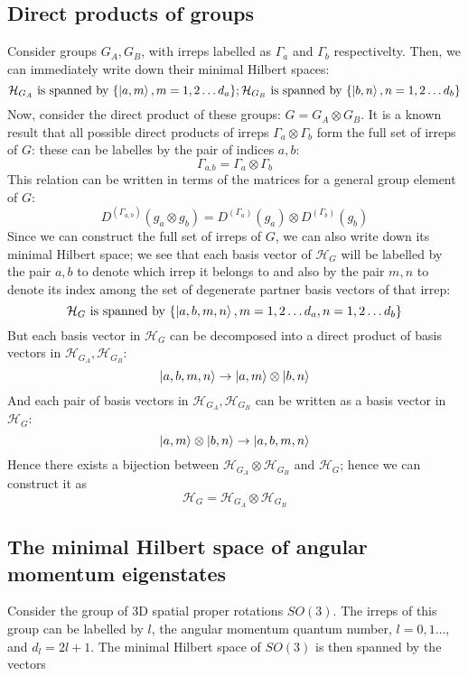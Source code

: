 \documentclass[12pt]{article}
\begin{document}
	\subsection{Direct products of groups}
	
	Consider groups $G_A, G_B$, with irreps labelled as $\Gamma_a$ and $\Gamma_b$ respectivelty. Then, we can immediately write down their minimal Hilbert spaces:
	$$\mathcal{H}_{G_A}\text{ is spanned by }\{\ket{a,m}, m=1,2\dots d_a\}; \mathcal{H}_{G_B}\text{ is spanned by }\{\ket{b,n}, n=1,2\dots d_b\}$$
	Now, consider the direct product of these groups: $G=G_A\otimes G_B$. It is a known result that all possible direct products of irreps $\Gamma_a\otimes\Gamma_b$ form the full set of irreps of $G$: these can be labelles by the pair of indices $a,b$:
	$$\Gamma_{a.b}=\Gamma_a\otimes\Gamma_b$$
	This relation can be written in terms of the matrices for a general group element of $G$:
	$$D^{\left(\Gamma_{a,b}\right)}(g_a \otimes g_b)=D^{\left(\Gamma_{a}\right)}(g_a) \otimes D^{\left(\Gamma_{b}\right)}(g_b)$$
	Since we can construct the full set of irreps of $G$, we can also write down its minimal Hilbert space; we see that each basis vector of $\mathcal{H}_G$ will be labelled by the pair $a,b$ to denote which irrep it belongs to and also by the pair $m,n$ to denote its index among the set of degenerate partner basis vectors of that irrep:
	$$\mathcal{H}_G\text{ is spanned by }\{\ket{a,b,m,n}, m=1,2\dots d_a,n=1,2\dots d_b\}$$
	But each basis vector in $\mathcal{H}_G$ can be decomposed into a direct product of basis vectors in $\mathcal{H}_{G_A},\mathcal{H}_{G_B}$:
	$$\ket{a,b,m,n}\to\ket{a,m}\otimes\ket{b,n}$$
	And each pair of basis vectors in $\mathcal{H}_{G_A},\mathcal{H}_{G_B}$ can be written as a basis vector in $\mathcal{H}_G$:
	$$\ket{a,m}\otimes\ket{b,n}\to\ket{a,b,m,n}$$
	Hence there exists a bijection between $\mathcal{H}_{G_A}\otimes\mathcal{H}_{G_B}$ and $\mathcal{H}_G$; hence we can construct it as
	$$\mathcal{H}_G=\mathcal{H}_{G_A}\otimes\mathcal{H}_{G_B}$$
	
	\subsection{The minimal Hilbert space of angular momentum eigenstates}
	
	Consider the group of 3D spatial proper rotations $SO(3)$. The irreps of this group can be labelled by $l$, the angular momentum quantum number, $l=0,1\dots$, and $d_l=2l+1$. The minimal Hilbert space of $SO(3)$ is then spanned by the vectors
	
\end{document}
